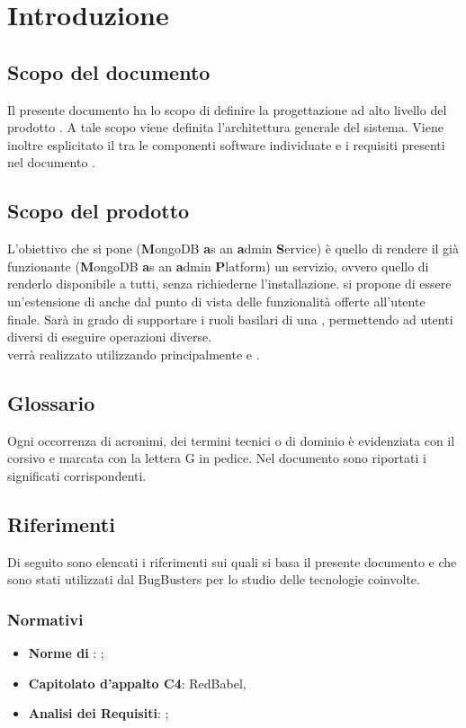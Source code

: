 \section{Introduzione}
\subsection{Scopo del documento}
Il presente documento ha lo scopo di definire la progettazione ad alto livello del prodotto . A tale scopo viene definita l'architettura generale del sistema. Viene inoltre esplicitato il  tra le componenti software individuate e i requisiti presenti nel documento \AnalisiDeiRequisiti. 

\subsection{Scopo del prodotto}
L'obiettivo che si pone  (\textbf{M}ongoDB \textbf{a}s an \textbf{a}dmin \textbf{S}ervice) è quello di rendere il già funzionante  (\textbf{M}ongoDB \textbf{a}s an \textbf{a}dmin \textbf{P}latform) un servizio, ovvero quello di renderlo disponibile a tutti, senza richiederne l'installazione.  si propone di essere un'estensione di  anche dal punto di vista delle funzionalità offerte all'utente finale. Sarà in grado di supportare i ruoli basilari di una , permettendo ad utenti diversi di eseguire operazioni diverse. \\
 verrà realizzato utilizzando principalmente  e .

\subsection{Glossario}
Ogni occorrenza di acronimi, dei termini tecnici o di dominio è evidenziata con il corsivo e marcata con la lettera G in pedice. Nel documento \Glossario sono riportati i significati corrispondenti.

\subsection{Riferimenti}
Di seguito sono elencati i riferimenti sui quali si basa il presente documento e che sono stati utilizzati dal  BugBusters per lo studio delle tecnologie coinvolte.

\subsubsection{Normativi}
\begin{itemize}
\item \textbf{Norme di }: \NormeDiProgetto;
\item \textbf{Capitolato d'appalto C4}: RedBabel,  
\item \textbf{Analisi dei Requisiti}: \AnalisiDeiRequisiti;
\end{itemize}
